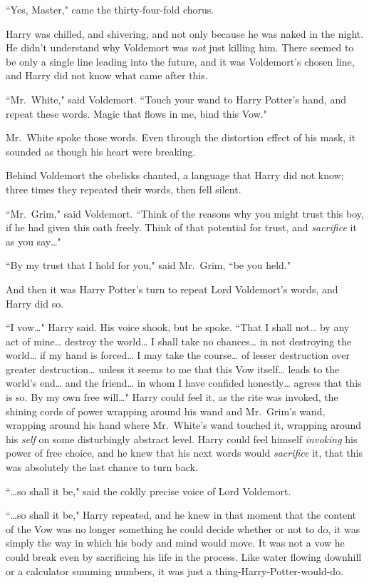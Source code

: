 ``Yes, Master," came the thirty-four-fold chorus.

Harry was chilled, and shivering, and not only because he was naked in the night. He didn't understand why Voldemort was \emph{not} just killing him. There seemed to be only a single line leading into the future, and it was Voldemort's chosen line, and Harry did not know what came after this.

``Mr.~White," said Voldemort. ``Touch your wand to Harry Potter's hand, and repeat these words. Magic that flows in me, bind this Vow."

Mr.~White spoke those words. Even through the distortion effect of his mask, it sounded as though his heart were breaking.

Behind Voldemort the obelisks chanted, a language that Harry did not know; three times they repeated their words, then fell silent.

``Mr.~Grim," said Voldemort. ``Think of the reasons why you might trust this boy, if he had given this oath freely. Think of that potential for trust, and \emph{sacrifice} it as you say{\ldots}"

``By my trust that I hold for you," said Mr.~Grim, ``be you held."

And then it was Harry Potter's turn to repeat Lord Voldemort's words, and Harry did so.

``I vow{\ldots}" Harry said. His voice shook, but he spoke. ``That I shall not{\ldots} by any act of mine{\ldots} destroy the world{\ldots} I shall take no chances{\ldots} in not destroying the world{\ldots} if my hand is forced{\ldots} I may take the course{\ldots} of lesser destruction over greater destruction{\ldots} unless it seems to me that this Vow itself{\ldots} leads to the world's end{\ldots} and the friend{\ldots} in whom I have confided honestly{\ldots} agrees that this is so. By my own free will{\ldots}" Harry could feel it, as the rite was invoked, the shining cords of power wrapping around his wand and Mr.~Grim's wand, wrapping around his hand where Mr.~White's wand touched it, wrapping around his \emph{self} on some disturbingly abstract level. Harry could feel himself \emph{invoking} his power of free choice, and he knew that his next words would \emph{sacrifice} it, that this was absolutely the last chance to turn back.

``{\ldots}so shall it be," said the coldly precise voice of Lord Voldemort.

``{\ldots}so shall it be," Harry repeated, and he knew in that moment that the content of the Vow was no longer something he could decide whether or not to do, it was simply the way in which his body and mind would move. It was not a vow he could break even by sacrificing his life in the process. Like water flowing downhill or a calculator summing numbers, it was just a thing-Harry-Potter-would-do.

